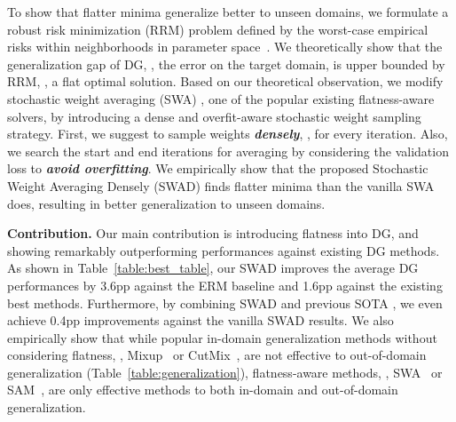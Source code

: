 To show that flatter minima generalize better to unseen domains, we formulate a robust risk minimization (RRM) problem defined by the worst-case empirical risks within neighborhoods in parameter space~\cite{norton2019diametrical, foret2020sharpness}.
We theoretically show that the generalization gap of DG, \ie, the error on the target domain, is upper bounded by RRM, \ie, a flat optimal solution.
Based on our theoretical observation, we modify stochastic weight averaging (SWA) \citep{izmailov2018swa}, one of the popular existing flatness-aware solvers, by introducing a dense and overfit-aware stochastic weight sampling strategy.
First, we suggest to sample weights \textbf{\textit{densely}}, \ie, for every iteration.
Also, we search the start and end iterations for averaging by considering the validation loss to \textbf{\textit{avoid overfitting}}.
We empirically show that the proposed Stochastic Weight Averaging Densely (SWAD) finds flatter minima than the vanilla SWA does, resulting in better generalization to unseen domains.

\textbf{Contribution.}
Our main contribution is introducing flatness into DG, and showing remarkably outperforming performances against existing DG methods. As shown in Table~\ref{table:best_table}, our SWAD improves the average DG performances by 3.6pp against the ERM baseline and 1.6pp against the existing best methods. Furthermore, by combining SWAD and previous SOTA \cite{sun2016coral}, we even achieve 0.4pp improvements against the vanilla SWAD results.
We also empirically show that while popular in-domain generalization methods without considering flatness, \eg, Mixup~\cite{zhang2018mixup} or CutMix~\cite{yun2019cutmix}, are not effective to out-of-domain generalization (Table~\ref{table:generalization}), flatness-aware methods, \eg, SWA~\cite{izmailov2018swa} or SAM~\cite{foret2020sharpness}, are only effective methods to both in-domain and out-of-domain generalization.


